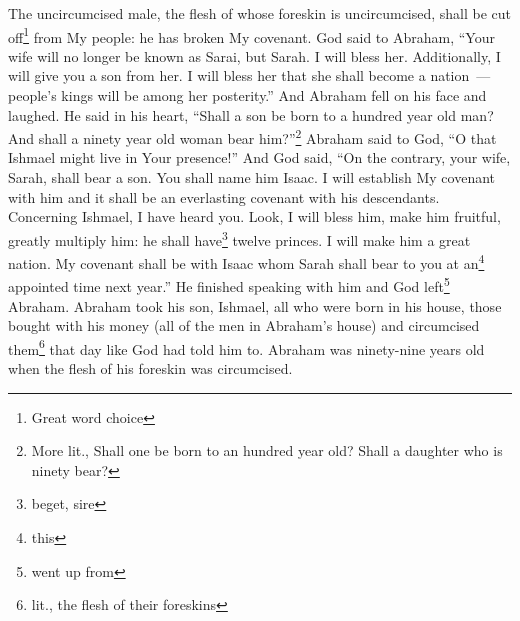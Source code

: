 \begin{enumerate}[align=center]
     The uncircumcised male, the flesh of whose foreskin is uncircumcised, shall be cut off\footnote{Great word choice} from My people: he has broken My covenant.%
     God said to Abraham, ``Your wife will no longer be known as Sarai, but Sarah.%
     I will bless her. Additionally, I will give you a son from her. I will bless her that she shall become a nation~--- people's kings will be among her posterity.''%
     And Abraham fell on his face and laughed. He said in his heart, ``Shall a son be born to a hundred year old man? And shall a ninety year old woman bear him?''\footnote{More lit., Shall one be born to an hundred year old? Shall a daughter who is ninety bear?}%
     Abraham said to God, ``O that Ishmael might live in Your presence!''%
     And God said, ``On the contrary, your wife, Sarah, shall bear a son. You shall name him Isaac. I will establish My covenant with him and it shall be an everlasting covenant with his descendants.%
     Concerning Ishmael, I have heard you. Look, I will bless him, make him fruitful, greatly multiply him: he shall have\footnote{beget, sire} twelve princes. I will make him a great nation.%
     My covenant shall be with Isaac whom Sarah shall bear to you at an\footnote{this} appointed time next year.''%
     He finished speaking with him and God left\footnote{went up from} Abraham.%
     Abraham took his son, Ishmael, all who were born in his house, those bought with his money (all of the men in Abraham's house) and circumcised them\footnote{lit., the flesh of their foreskins} that day like God had told him to.%
     Abraham was ninety-nine years old when the flesh of his foreskin was circumcised.%
\end{enumerate}
